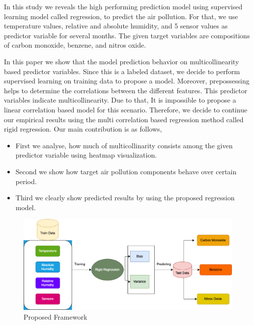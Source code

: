 In this study we reveals the high performing prediction model
using supervised learning model called regression, to predict the air pollution.
For that, we use temperature values, relative and absolute humidity, 
and 5 sensor values as predictor variable for several months.
The given target variables are compositions of carbon monoxide, benzene, and nitros oxide.

{}
In this paper we show that the model prediction behavior on multicollinearity based predictor variables. 
Since this is a labeled dataset, we 
decide to perform supervised learning on training data to propose a model.
Moreover, prepossessing helps to determine the 
correlations between the different features.
This predictor variables indicate multicollinearity.
Due to that, It is impossible to propose a linear correlation based model for this scenario. 
Therefore, we decide to continue our empirical 
results using the multi correlation based regression method called rigid regression. 
Our main contribution is as follows,
\begin{itemize}
	\item First we analyse, how much of multicollinarity consists among the given predictor variable using heatmap visualization.
	\item Second we show how target air pollution components behave over certain period.
	\item Third we clearly show predicted results by using the proposed regression model.
\end{itemize}

\begin{figure}
  \centering
 \includegraphics[width=1.0\linewidth,height=0.6\linewidth]{graphics//Fig_AirPrediction.eps}
  \caption{Proposed Framework} \label{Fig_AirPrediction}
\end{figure}

